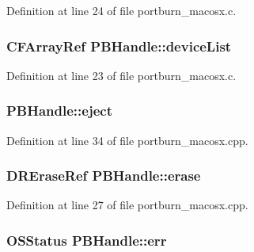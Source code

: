 Definition at line 24 of file portburn\+\_\+macosx.\+c.

\subsubsection[{\texorpdfstring{device\+List}{deviceList}}]{\setlength{\rightskip}{0pt plus 5cm}C\+F\+Array\+Ref P\+B\+Handle\+::device\+List}\hypertarget{struct_p_b_handle_ace5047183d08047e660c0252ca5c5dc9}{}\label{struct_p_b_handle_ace5047183d08047e660c0252ca5c5dc9}


Definition at line 23 of file portburn\+\_\+macosx.\+c.

\subsubsection[{\texorpdfstring{eject}{eject}}]{ P\+B\+Handle\+::eject}\hypertarget{struct_p_b_handle_a4b0523968938f3312f97cf1ced6a6629}{}\label{struct_p_b_handle_a4b0523968938f3312f97cf1ced6a6629}


Definition at line 34 of file portburn\+\_\+macosx.\+cpp.

\subsubsection[{\texorpdfstring{erase}{erase}}]{\setlength{\rightskip}{0pt plus 5cm}D\+R\+Erase\+Ref P\+B\+Handle\+::erase}\hypertarget{struct_p_b_handle_abf80ec4272e96d2b3db16f8e6f125294}{}\label{struct_p_b_handle_abf80ec4272e96d2b3db16f8e6f125294}


Definition at line 27 of file portburn\+\_\+macosx.\+cpp.

\subsubsection[{\texorpdfstring{err}{err}}]{\setlength{\rightskip}{0pt plus 5cm}O\+S\+Status P\+B\+Handle\+::err}\hypertarget{struct_p_b_handle_aaee4fff5e93b7d98ceddd6cd8da97a98}{}\label{struct_p_b_handle_aaee4fff5e93b7d98ceddd6cd8da97a98}


